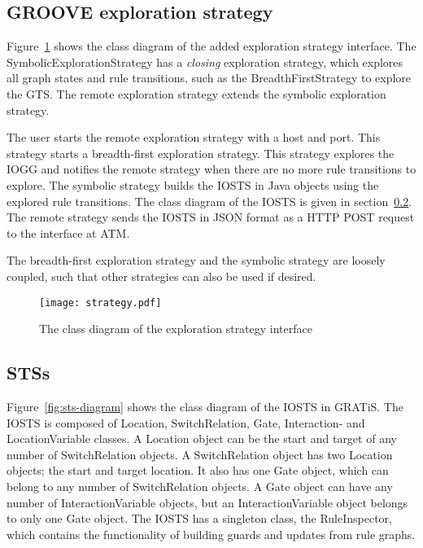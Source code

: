 \subsection{GROOVE exploration strategy}
Figure~\ref{fig:esi-diagram} shows the class diagram of the added exploration strategy interface. The SymbolicExplorationStrategy has a \textit{closing} exploration strategy, which explores all graph states and rule transitions, such as the BreadthFirstStrategy to explore the GTS. The remote exploration strategy extends the symbolic exploration strategy.

The user starts the remote exploration strategy with a host and port. This strategy starts a breadth-first exploration strategy. This strategy explores the IOGG and notifies the remote strategy when there are no more rule transitions to explore. The symbolic strategy builds the IOSTS in Java objects using the explored rule transitions. The class diagram  of the IOSTS is given in section~\ref{sec:sts-setup}. The remote strategy sends the IOSTS in JSON format as a HTTP POST request to the interface at ATM.

The breadth-first exploration strategy and the symbolic strategy are loosely coupled, such that other strategies can also be used if desired.
 
\begin{figure}[ht]
  \begin{center}
    \texttt{[image: strategy.pdf]}
  \end{center}
  \caption{The class diagram of the exploration strategy interface}
  \label{fig:esi-diagram}
\end{figure}

\subsection{STSs}\label{sec:sts-setup}
Figure~\ref{fig:sts-diagram} shows the class diagram of the IOSTS in GRATiS. The IOSTS is composed of Location, SwitchRelation, Gate, Interaction- and LocationVariable classes. A Location object can be the start and target of any number of SwitchRelation objects. A SwitchRelation object has two Location objects; the start and target location. It also has one Gate object, which can belong to any number of SwitchRelation objects. A Gate object can have any number of InteractionVariable objects, but an InteractionVariable object belongs to only one Gate object. The IOSTS has a singleton class, the RuleInspector, which contains the functionality of building guards and updates from rule graphs.

